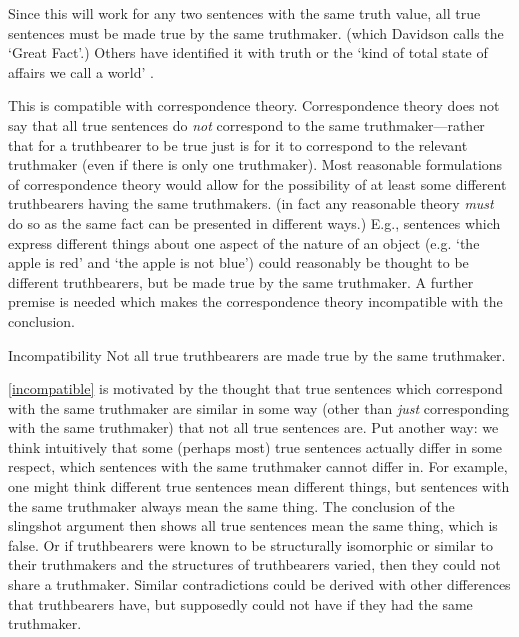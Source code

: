 Since this will work for any two sentences with the same truth value, all true sentences must be made true by the same truthmaker. (which Davidson calls the `Great Fact'.)
\parencite[753]{Davidson_1969}
Others have identified it with truth \parencite[216]{Frege_1948} or the `kind of total state of affairs we call a world' \parencite[242]{Lewis1943-LEWTMO}.

This is compatible with correspondence theory.
Correspondence theory does not say that all true sentences do \emph{not} correspond to the same truthmaker---rather that for a truthbearer to be true just is for it to correspond to the relevant truthmaker (even if there is only one truthmaker).
Most reasonable formulations of correspondence theory would allow for the possibility of at least some different truthbearers having the same truthmakers.
(in fact any reasonable theory \emph{must} do so as the same fact can be presented in different ways.) %
E.g., sentences which express different things about one aspect of the nature of an object (e.g. `the apple is red' and `the apple is not blue')	could reasonably be thought to be different truthbearers, but be made true by the same truthmaker.
A further premise is needed which makes the correspondence theory incompatible with the conclusion.

	\begin{principle}{Incompatibility}\label{incompatible}
	Not all true truthbearers are made true by the same truthmaker.
	\end{principle}

\ref{incompatible} is motivated by the thought that true sentences which correspond with the same truthmaker are similar in some way (other than \emph{just} corresponding with the same truthmaker) that not all true sentences are.
Put another way: we think intuitively that some (perhaps most) true sentences actually differ in some respect, which sentences with the same truthmaker cannot differ in.
For example, one might think different true sentences mean different things, but sentences with the same truthmaker always mean the same thing.
The conclusion of the slingshot argument then shows all true sentences mean the same thing, which is false.
Or if truthbearers were known to be structurally isomorphic or similar to their truthmakers and the structures of truthbearers varied, then they could not share a truthmaker.
Similar contradictions could be derived with other differences that truthbearers have, but supposedly could not have if they had the same truthmaker.

